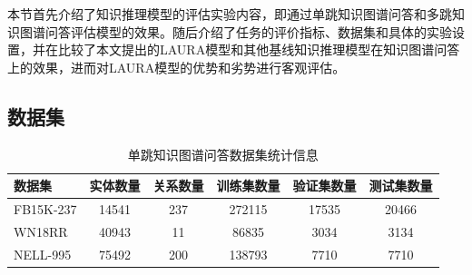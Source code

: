 \documentclass[algorithmlist, AutoFakeBold, AutoFakeSlant, figurelist, tablelist, nomlist, engineering]{seuthesix}
\begin{document}
本节首先介绍了知识推理模型的评估实验内容，即通过单跳知识图谱问答和多跳知识图谱问答评估模型的效果。随后介绍了任务的评价指标、数据集和具体的实验设置，并在比较了本文提出的LAURA模型和其他基线知识推理模型在知识图谱问答上的效果，进而对LAURA模型的优势和劣势进行客观评估。

\subsection{数据集}
\begin{table}[t]
  \centering
  \caption{单跳知识图谱问答数据集统计信息}
  \begin{tabular*}{0.95\textwidth}{@{\extracolsep{\fill}}lccccc}
    \toprule[1pt]
    数据集 & 实体数量 & 关系数量 & 训练集数量 & 验证集数量 & 测试集数量 \\ \hline
    FB15K-237 & 14541 & 237 & 272115 & 17535 & 20466\\
    WN18RR & 40943 & 11 & 86835 & 3034 & 3134\\
    NELL-995 & 75492 & 200 & 138793 & 7710 & 7710\\
    \bottomrule[1pt]
	\end{tabular*}
  \label{Datasets1_1}
\end{table}
\end{document}
